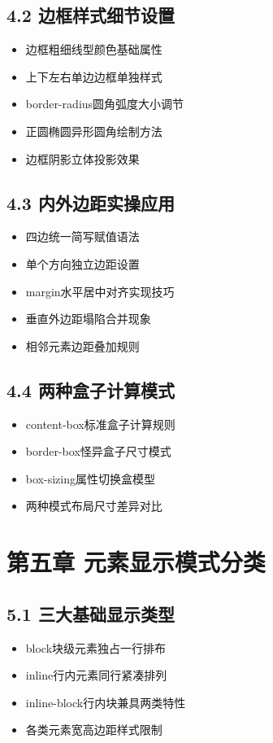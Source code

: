\subsection{4.2 边框样式细节设置}
\begin{itemize}[leftmargin=*]
\item 边框粗细线型颜色基础属性
\item 上下左右单边边框单独样式
\item border-radius圆角弧度大小调节
\item 正圆椭圆异形圆角绘制方法
\item 边框阴影立体投影效果
\end{itemize}

\subsection{4.3 内外边距实操应用}
\begin{itemize}[leftmargin=*]
\item 四边统一简写赋值语法
\item 单个方向独立边距设置
\item margin水平居中对齐实现技巧
\item 垂直外边距塌陷合并现象
\item 相邻元素边距叠加规则
\end{itemize}

\subsection{4.4 两种盒子计算模式}
\begin{itemize}[leftmargin=*]
\item content-box标准盒子计算规则
\item border-box怪异盒子尺寸模式
\item box-sizing属性切换盒模型
\item 两种模式布局尺寸差异对比
\end{itemize}

\section{第五章 元素显示模式分类}
\subsection{5.1 三大基础显示类型}
\begin{itemize}[leftmargin=*]
\item block块级元素独占一行排布
\item inline行内元素同行紧凑排列
\item inline-block行内块兼具两类特性
\item 各类元素宽高边距样式限制
\end{itemize}

